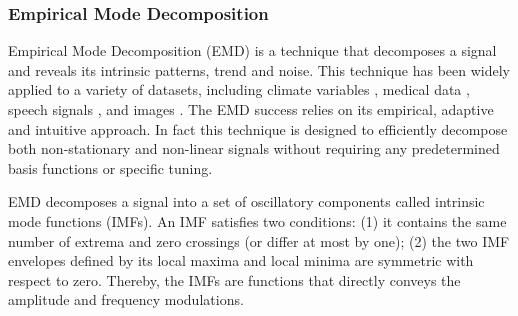 % 
% 


\subsubsection{Empirical Mode Decomposition} \label{emd}
Empirical Mode Decomposition (EMD) \cite{huang:emd1998} is a technique that decomposes a signal and reveals its intrinsic patterns, trend and noise.
This technique has been widely applied to a variety of datasets, including climate variables \cite{lee:climateEMD2011}, medical data \cite{blanco:bioMed2008}, speech signals \cite{huang:signalProc2006,hasan:ieeeletter2009}, and images \cite{nunes:vision2005}.
The EMD success relies on its empirical, adaptive and intuitive approach.
In fact this technique is designed to efficiently decompose both non-stationary and non-linear signals without requiring any predetermined basis functions or specific tuning.  

EMD decomposes a signal into a set of oscillatory components called intrinsic mode functions (IMFs). 
An IMF satisfies two conditions: (1) it contains the same number of extrema and zero crossings (or differ at most by one); (2) the two IMF envelopes defined by its local maxima and local minima are symmetric with respect to zero. 
Thereby, the IMFs are functions that directly conveys the amplitude and frequency modulations.

